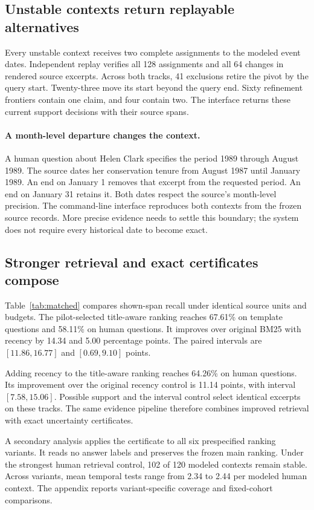 \subsection{Unstable contexts return replayable alternatives}

Every unstable context receives two complete assignments to the modeled event dates.
Independent replay verifies all 128 assignments and all 64 changes in rendered source excerpts.
Across both tracks, 41 exclusions retire the pivot by the query start.
Twenty-three move its start beyond the query end.
Sixty refinement frontiers contain one claim, and four contain two.
The interface returns these current support decisions with their source spans.

\paragraph{A month-level departure changes the context.}
A human question about Helen Clark specifies the period 1989 through August 1989.
The source dates her conservation tenure from August 1987 until January 1989.
An end on January 1 removes that excerpt from the requested period.
An end on January 31 retains it.
Both dates respect the source's month-level precision.
The command-line interface reproduces both contexts from the frozen source records.
More precise evidence needs to settle this boundary; the system does not require every historical date to become exact.

\subsection{Stronger retrieval and exact certificates compose}

Table~\ref{tab:matched} compares shown-span recall under identical source units and budgets.
The pilot-selected title-aware ranking reaches 67.61\% on template questions and 58.11\% on human questions.
It improves over original BM25 with recency by 14.34 and 5.00 percentage points.
The paired intervals are $[11.86,16.77]$ and $[0.69,9.10]$ points.


Adding recency to the title-aware ranking reaches 64.26\% on human questions.
Its improvement over the original recency control is 11.14 points, with interval $[7.58,15.06]$.
Possible support and the interval control select identical excerpts on these tracks.
The same evidence pipeline therefore combines improved retrieval with exact uncertainty certificates.

A secondary analysis applies the certificate to all six prespecified ranking variants.
It reads no answer labels and preserves the frozen main ranking.
Under the strongest human retrieval control, 102 of 120 modeled contexts remain stable.
Across variants, mean temporal tests range from 2.34 to 2.44 per modeled human context.
The appendix reports variant-specific coverage and fixed-cohort comparisons.


